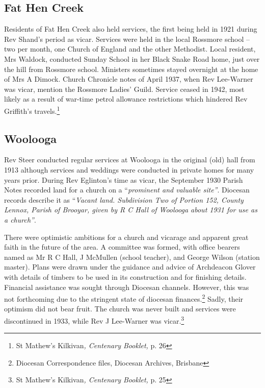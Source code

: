 \subsection{Fat Hen Creek}



Residents of Fat Hen Creek also held services, the first being held in 1921 during Rev Shand's period as vicar. Services were held in the local Rossmore school -- two per month, one Church of England and the other Methodist. Local resident, Mrs Waldock, conducted Sunday School in her Black Snake Road home, just over the hill from Rossmore school. Ministers sometimes stayed overnight at the home of Mrs A Dimock. Church Chronicle notes of April 1937, when Rev Lee-Warner was vicar, mention the Rossmore Ladies' Guild. Service ceased in 1942, most likely as a result of war-time petrol allowance restrictions which hindered Rev Griffith's travels.\footnote{St Mathew's Kilkivan\emph{, Centenary Booklet,} p. 26}


\subsection{Woolooga}



Rev Steer conducted regular services at Woolooga in the original (old) hall from 1913 although services and weddings were conducted in private homes for many years prior. During Rev Eglinton's time as vicar, the September 1930 Parish Notes recorded land for a church on a ``\emph{prominent and valuable site''}. Diocesan records describe it as ``\emph{Vacant land. Subdivision Two of Portion 152, County Lennox, Parish of Brooyar, given by R C Hall of Woolooga about 1931 for use as a church''}.



\smallskip


\balance


There were optimistic ambitions for a church and vicarage and apparent great faith in the future of the area. A committee was formed, with office bearers named as Mr R C Hall, J McMullen (school teacher), and George Wilson (station master). Plans were drawn under the guidance and advice of Archdeacon Glover with details of timbers to be used in its construction and for finishing details. Financial assistance was sought through Diocesan channels. However, this was not forthcoming due to the stringent state of diocesan finances.\footnote{Diocesan Correspondence files, Diocesan Archives, Brisbane} Sadly, their optimism did not bear fruit. The church was never built and services were discontinued in 1933, while Rev J Lee-Warner was vicar.\footnote{St Mathew's Kilkivan\emph{, Centenary Booklet,} p. 25}


